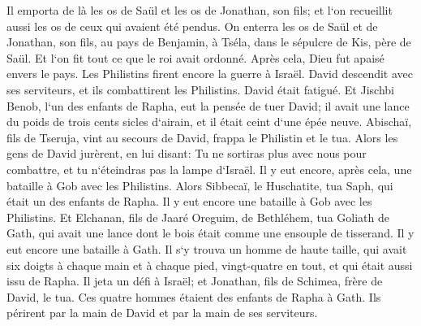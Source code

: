 \verse Il emporta de là les os de Saül et les os de Jonathan, son fils; et l`on recueillit aussi les os de ceux qui avaient été pendus. 
\verse On enterra les os de Saül et de Jonathan, son fils, au pays de Benjamin, à Tséla, dans le sépulcre de Kis, père de Saül. Et l`on fit tout ce que le roi avait ordonné. Après cela, Dieu fut apaisé envers le pays. 
\verse Les Philistins firent encore la guerre à Israël. David descendit avec ses serviteurs, et ils combattirent les Philistins. David était fatigué. 
\verse Et Jischbi Benob, l`un des enfants de Rapha, eut la pensée de tuer David; il avait une lance du poids de trois cents sicles d`airain, et il était ceint d`une épée neuve. 
\verse Abischaï, fils de Tseruja, vint au secours de David, frappa le Philistin et le tua. Alors les gens de David jurèrent, en lui disant: Tu ne sortiras plus avec nous pour combattre, et tu n`éteindras pas la lampe d`Israël. 
\verse Il y eut encore, après cela, une bataille à Gob avec les Philistins. Alors Sibbecaï, le Huschatite, tua Saph, qui était un des enfants de Rapha. 
\verse Il y eut encore une bataille à Gob avec les Philistins. Et Elchanan, fils de Jaaré Oreguim, de Bethléhem, tua Goliath de Gath, qui avait une lance dont le bois était comme une ensouple de tisserand. 
\verse Il y eut encore une bataille à Gath. Il s`y trouva un homme de haute taille, qui avait six doigts à chaque main et à chaque pied, vingt-quatre en tout, et qui était aussi issu de Rapha. 
\verse Il jeta un défi à Israël; et Jonathan, fils de Schimea, frère de David, le tua. 
\verse Ces quatre hommes étaient des enfants de Rapha à Gath. Ils périrent par la main de David et par la main de ses serviteurs. 

